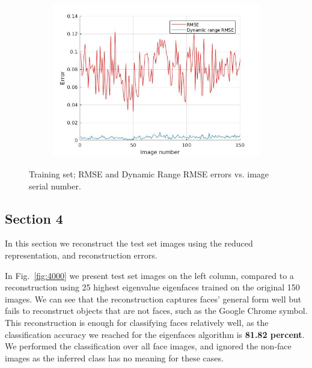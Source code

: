 \documentclass[a4paper]{iacas}
\begin{document}
\begin{figure}[!htbp]
	\centering
	\begin{subfigure}[b]{0.5\textwidth}
		\includegraphics[width=\textwidth]{310.jpg}
		\label{fig:310}
	\end{subfigure}
	
	\caption{Training set; RMSE and Dynamic Range RMSE errors vs. image serial number.}
	\label{fig:300}
\end{figure}

\subsection{Section 4}

In this section we reconstruct the test set images using the reduced representation, and reconstruction errors.

In Fig.~\ref{fig:4000} we present test set images on the left column, compared to a reconstruction using 25 highest eigenvalue eigenfaces trained on the original 150 images. We can see that the reconstruction captures faces' general form well but fails to reconstruct objects that are not faces, such as the Google Chrome symbol. This reconstruction is enough for classifying faces relatively well, as the classification accuracy we reached for the eigenfaces algorithm is \textbf{81.82 percent}. We performed the classification over all face images, and ignored the non-face images as the inferred class has no meaning for these cases.
\end{document}
